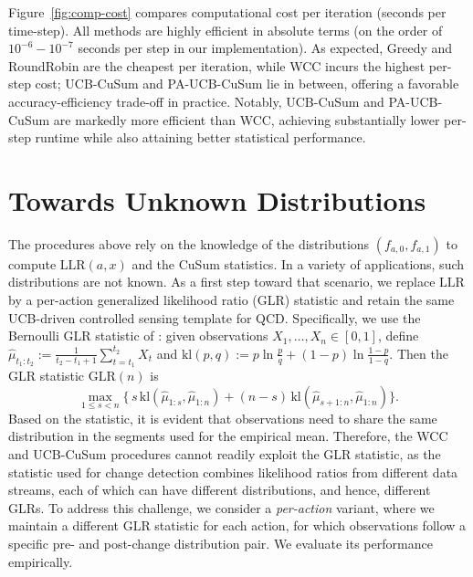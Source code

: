 \documentclass[letterpaper, 10 pt, conference]{ieeeconf}  %
\begin{document}
Figure~\ref{fig:comp-cost} compares computational cost per iteration (seconds per time-step).
All methods are highly efficient in absolute terms (on the order of $10^{-6}-10^{-7}$ seconds per step in our implementation). As expected, Greedy and RoundRobin are the cheapest per iteration, while WCC incurs the highest per-step cost; UCB-CuSum and PA-UCB-CuSum lie in between, offering a favorable accuracy-efficiency trade-off in practice. Notably, UCB-CuSum and PA-UCB-CuSum are markedly more efficient than WCC, achieving substantially lower per-step runtime while also attaining better statistical performance. 

\section{Towards Unknown Distributions} \label{secHo:unknown}
\label{sec:unknown}
The procedures above rely on the knowledge of the distributions  $(f_{a,0},f_{a,1})$ to compute  $\mathrm{LLR}(a,x)$ and the CuSum statistics. In a variety of applications, such distributions are not known. 
As a first step toward that scenario, we replace $\mathrm{LLR}$ by a per-action generalized likelihood ratio (GLR) statistic and retain the same
UCB-driven controlled sensing template for QCD. Specifically, we use the Bernoulli GLR statistic of \cite{besson2022efficient}:
given observations $X_1,\dots,X_n\in[0,1]$, define $\hat\mu_{t_1:t_2}:=\frac{1}{t_2-t_1+1}\sum_{t=t_1}^{t_2}X_t$ and $
\mathrm{kl}(p,q):=p\ln\!\frac{p}{q}+(1-p)\ln\!\frac{1-p}{1-q}.$
Then the GLR statistic $\mathrm{GLR}(n)$ is
\[
\max_{1\le s< n}\{\, s\,\mathrm{kl}(\hat\mu_{1:s},\hat\mu_{1:n})
+(n-s)\,\mathrm{kl}(\hat\mu_{s+1:n},\hat\mu_{1:n})\}.
\]
Based on the statistic, it is evident that observations need to share the same distribution in the segments used for the empirical mean. Therefore, the WCC and UCB-CuSum procedures cannot readily exploit the GLR statistic, as the statistic used for change detection combines likelihood ratios from different data streams, each of which can have different distributions, and hence, different GLRs. To address this challenge, we consider a  \emph{per-action} variant, where we maintain a different GLR statistic for each action, for which observations follow a  specific pre- and post-change distribution pair. We evaluate its performance empirically.
\end{document}
